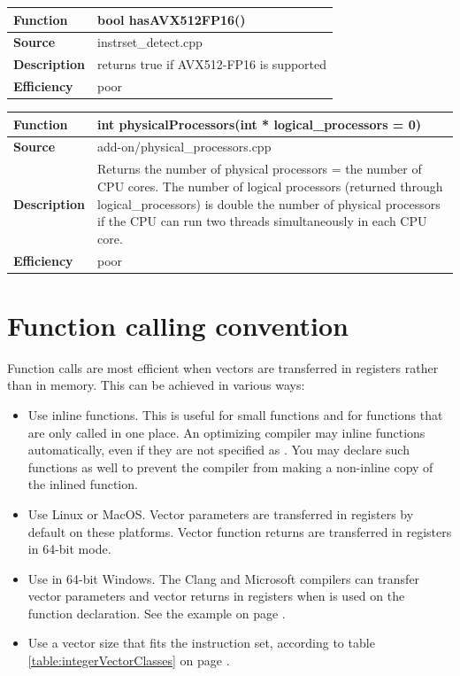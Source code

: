 \documentclass[vcl_manual.tex]{subfiles}
\begin{document}
\begin{tabular}{|p{25mm}|p{100mm}|}
\hline
\bfseries Function & bool hasAVX512FP16() \\ \hline
\bfseries Source & instrset\_detect.cpp \\ \hline
\bfseries Description & returns true if AVX512-FP16 is supported \\ \hline
 \bfseries Efficiency & poor \\ \hline
\end{tabular}

\label{physicalProcessors}
\begin{tabular}{|p{25mm}|p{100mm}|}
\hline
\bfseries Function & int physicalProcessors(int * logical\_processors = 0) \\ \hline
\bfseries Source & add-on/physical\_processors.cpp \\ \hline
\bfseries Description & Returns the number of physical processors = the number of 
CPU cores. The number of logical processors (returned through 
logical\_processors) is double the number of physical processors if the CPU can run two threads simultaneously in each CPU core. \\ \hline
 \bfseries Efficiency & poor \\ \hline
\end{tabular}


\section{Function calling convention}\label{FunctionCallingConvention}
Function calls are most efficient when vectors are transferred in registers rather than in memory. This can be achieved in various ways:

\begin{itemize}
\item Use inline functions. This is useful for small functions and for functions that are only called in one place. An optimizing compiler may inline functions automatically, even if they are not specified as . You may declare such functions  as well to prevent the compiler from making a non-inline copy of the inlined function.

\item Use Linux or MacOS. Vector parameters are transferred in registers by default on these platforms. Vector function returns are transferred in registers in 64-bit mode.

\item Use  in 64-bit Windows. The Clang and Microsoft compilers can transfer vector parameters and vector returns in registers when  is used on the function declaration. See the example on page \pageref{examplePolynomialVectorcall}.

\item Use a vector size that fits the instruction set, according to table \ref{table:integerVectorClasses} on page \pageref{table:integerVectorClasses}.

\end{itemize}
\end{document}
